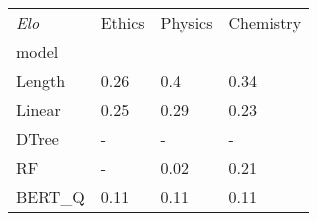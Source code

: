 \begin{tabular}{llll}
\toprule
\textit{Elo} & Ethics & Physics & Chemistry \\
model  &        &         &           \\
\midrule
Length &   0.26 &     0.4 &      0.34 \\
Linear &   0.25 &    0.29 &      0.23 \\
DTree  &      - &       - &         - \\
RF     &      - &    0.02 &      0.21 \\
BERT\_Q &   0.11 &    0.11 &      0.11 \\
\bottomrule
\end{tabular}
